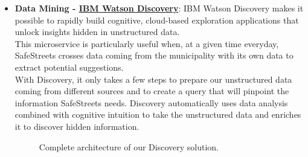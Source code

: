 \begin{itemize}
	\item \textbf{Data Mining - \href{https://cloud.ibm.com/catalog/services/discovery}{IBM Watson Discovery}}: IBM Watson Discovery makes it possible to rapidly build cognitive, cloud-based exploration applications that unlock insights hidden in unstructured data. 
	\\This microservice is particularly useful when, at a given time everyday, SafeStreets crosses data coming from the municipality with its own data to extract potential suggestions.
	\\With Discovery, it only takes a few steps to prepare our unstructured data coming from different sources and to create a query that will pinpoint the information SafeStreets needs. Discovery automatically uses data analysis combined with cognitive intuition to take the unstructured data and enriches it to discover hidden information.
	\begin{figure}[h!]
		\caption{Complete architecture of our Discovery solution.}
	\end{figure}
	\FloatBarrier
	
\end{itemize}